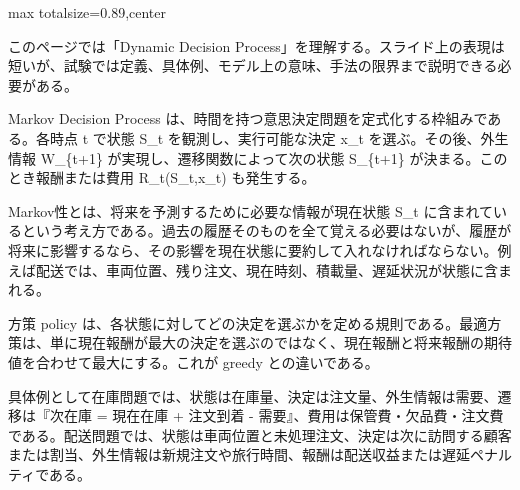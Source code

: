 \begin{minipage}[t]{0.58\textwidth}
\begin{adjustbox}{max totalsize={\textwidth}{0.89\textheight},center}
\begin{minipage}{\textwidth}\scriptsize
{}このページでは「Dynamic Decision Process」を理解する。スライド上の表現は短いが、試験では定義、具体例、モデル上の意味、手法の限界まで説明できる必要がある。\par
Markov Decision Process は、時間を持つ意思決定問題を定式化する枠組みである。各時点 t で状態 S\_t を観測し、実行可能な決定 x\_t を選ぶ。その後、外生情報 W\_\{t+1\} が実現し、遷移関数によって次の状態 S\_\{t+1\} が決まる。このとき報酬または費用 R\_t(S\_t,x\_t) も発生する。\par
Markov性とは、将来を予測するために必要な情報が現在状態 S\_t に含まれているという考え方である。過去の履歴そのものを全て覚える必要はないが、履歴が将来に影響するなら、その影響を現在状態に要約して入れなければならない。例えば配送では、車両位置、残り注文、現在時刻、積載量、遅延状況が状態に含まれる。\par
方策 policy は、各状態に対してどの決定を選ぶかを定める規則である。最適方策は、単に現在報酬が最大の決定を選ぶのではなく、現在報酬と将来報酬の期待値を合わせて最大にする。これが greedy との違いである。\par
具体例として在庫問題では、状態は在庫量、決定は注文量、外生情報は需要、遷移は『次在庫 = 現在在庫 + 注文到着 - 需要』、費用は保管費・欠品費・注文費である。配送問題では、状態は車両位置と未処理注文、決定は次に訪問する顧客または割当、外生情報は新規注文や旅行時間、報酬は配送収益または遅延ペナルティである。\par

\end{minipage}
\end{adjustbox}
\end{minipage}
